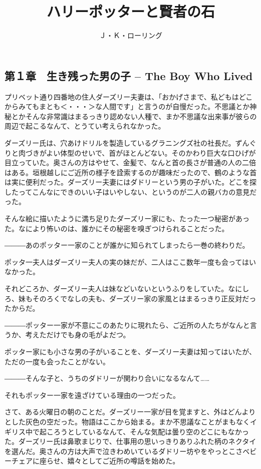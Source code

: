 \documentclass[10pt,a4paper]{article}
\title{ハリーポッターと賢者の石}
\author{Ｊ・Ｋ・ローリング}
\date{}
\begin{document}
\begin{CJK}{UTF8}{min}


\maketitle


\tableofcontents

\section{第１章　生き残った男の子 -- The Boy Who Lived}

プリベット通り四番地の住人ダーズリー夫妻は、「おかげさまで、私どもはどこからみてもまとも＜・・・＞な人間です」と言うのが自慢だった。不思議とか神秘とかそんな非常識はまるっきり認めない人種で、まか不思議な出来事が彼らの周辺で起こるなんて、とうてい考えられなかった。

ダーズリー氏は、穴あけドリルを製造しているグラニングズ社の社長だ。ずんぐりと肉づきがよい体型のせいで、首がほとんどない。そのかわり巨大な口ひげが目立っていた。奥さんの方はやせて、金髪で、なんと首の長さが普通の人の二倍はある。垣根越しにご近所の様子を詮索するのが趣味だったので、鶴のような首は実に便利だった。ダーズリー夫妻にはダドリーという男の子がいた。どこを探したってこんなにできのいい子はいやしない、というのが二人の親バカの意見だった。

そんな絵に描いたように満ち足りたダーズリー家にも、たった一つ秘密があった。なにより怖いのは、誰かにその秘密を嗅ぎつけられることだった。

―――あのポッター一家のことが誰かに知られてしまったら一巻の終わりだ。

ポッタ一夫人はダーズリー夫人の実の妹だが、二人はここ数年一度も会ってはいなかった。

それどころか、ダーズリー夫人は妹などいないというふりをしていた。なにしろ、妹もそのろくでなしの夫も、ダーズリー家の家風とはまるっきり正反対だったからだ。

―――ポッター一家が不意にこのあたりに現れたら、ご近所の人たちがなんと言うか、考えただけでも身の毛がよだつ。

ポッター家にも小さな男の子がいることを、ダーズリー夫妻は知ってはいたが、ただの一度も会ったことがない。

―――そんな子と、うちのダドリーが関わり合いになるなんて……

それもポッター一家を遠ざけている理由の一つだった。



さて、ある火曜日の朝のことだ。ダーズリー一家が目を覚ますと、外はどんよりとした灰色の空だった。物語はここから始まる。まか不思議なことがまもなくイギリス中で起ころうとしているなんて、そんな気配は曇り空のどこにもなかった。ダーズリー氏は鼻歌まじりで、仕事用の思いっきりありふれた柄のネクタイを選んだ。奥さんの方は大声で泣きわめいているダドリー坊やをやっとこさベビーチェアに座らせ、嬉々としてご近所の噂話を始めた。


\end{CJK}
\end{document}
